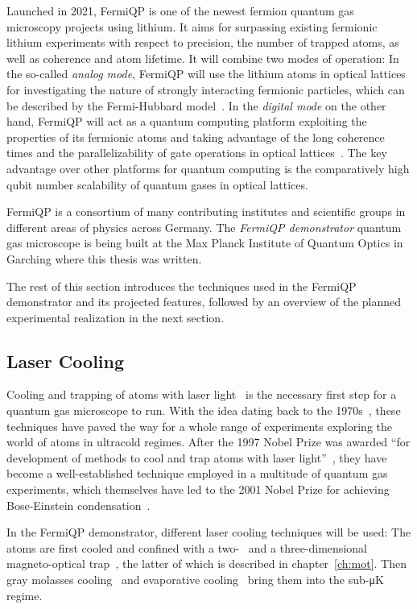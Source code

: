 Launched in 2021, FermiQP is one of the newest fermion quantum gas microscopy projects using lithium. It aims for surpassing existing fermionic lithium experiments with respect to precision, the number of trapped atoms, as well as coherence and atom lifetime. It will combine two modes of operation: In the so-called \textit{analog mode}, FermiQP will use the lithium atoms in optical lattices for investigating the nature of strongly interacting fermionic particles, which can be described by the Fermi-Hubbard model~\cite{hubbard_electron_1963, esslinger_fermi-hubbard_2010}. In the \textit{digital mode} on the other hand, FermiQP will act as a quantum computing platform exploiting the properties of its fermionic atoms and taking advantage of the long coherence times and the parallelizability of gate operations in optical lattices~\cite{zhang_functional_2022}. The key advantage over other platforms for quantum computing is the comparatively high qubit number scalability of quantum gases in optical lattices.

FermiQP is a consortium of many contributing institutes and scientific groups in different areas of physics across Germany. The \textit{FermiQP demonstrator} quantum gas microscope is being built at the Max Planck Institute of Quantum Optics in Garching where this thesis was written.

The rest of this section introduces the techniques used in the FermiQP demonstrator and its projected features, followed by an overview of the planned experimental realization in the next section.

\subsection*{Laser Cooling}\label{ch:laser_cooling}
Cooling and trapping of atoms with laser light~\cite{foot_atomic_2005,metcalf_laser_1999} is the necessary first step for a quantum gas microscope to run. With the idea dating back to the 1970s~\cite{hansch_cooling_1975}, these techniques have paved the way for a whole range of experiments exploring the world of atoms in ultracold regimes. After the 1997 Nobel Prize was awarded ``for development of methods to cool and trap atoms with laser light''~\cite{noauthor_nobel_nodate}, they have become a well-established technique employed in a multitude of quantum gas experiments, which themselves have led to the 2001 Nobel Prize for achieving Bose-Einstein condensation~\cite{noauthor_nobel_nodate-1}.

In the FermiQP demonstrator, different laser cooling techniques will be used: The atoms are first cooled and confined with a two-~\cite{qesja_notitle_2022} and a three-dimensional magneto-optical trap~\cite{foot_atomic_2005}, the latter of which is described in chapter~\ref{ch:mot}. Then gray molasses cooling~\cite{weidemuller_novel_1994} and evaporative cooling~\cite{foot_atomic_2005, sun_construction_2022} bring them into the sub-\si[]{\micro\kelvin} regime.

